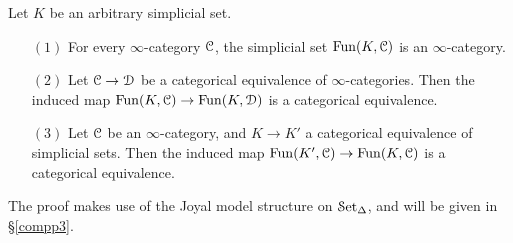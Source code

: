 \begin{1.2.7 Functors between higher cats}
\begin{proposition}\label{tyty}
Let $K$ be an arbitrary simplicial set.
\begin{itemize}
\item[$(1)$] For every $\infty$-category $\operatorname{\mathcal{C}}$, the simplicial set $\operatorname{Fun}(K,\operatorname{\mathcal{C}})$ is an $\infty$-category.

\item[$(2)$] Let $\operatorname{\mathcal{C}} \rightarrow \operatorname{\mathcal{D}}$ be a categorical equivalence of $\infty$-categories. Then the induced map $\operatorname{Fun}(K,\operatorname{\mathcal{C}}) \rightarrow \operatorname{Fun}(K,\operatorname{\mathcal{D}})$ is a categorical equivalence.

\item[$(3)$] Let $\operatorname{\mathcal{C}}$ be an $\infty$-category, and $K \rightarrow K'$ a categorical equivalence of simplicial sets. Then the induced map $\operatorname{Fun}(K',\operatorname{\mathcal{C}}) \rightarrow \operatorname{Fun}(K,\operatorname{\mathcal{C}})$ is a categorical equivalence.
\end{itemize}
\end{proposition}

The proof makes use of the Joyal model structure on $\operatorname{\mathcal{S}et_{\Delta}}$, and will be given in \S \ref{compp3}.
\end{1.2.7 Functors between higher cats}
